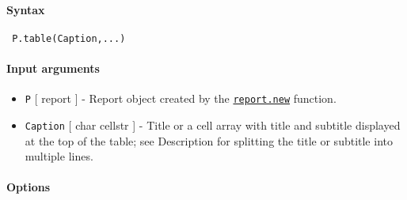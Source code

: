 


	\paragraph{Syntax}
 
 \begin{verbatim}
 P.table(Caption,...)
 \end{verbatim}
 
 \paragraph{Input arguments}
 
 \begin{itemize}
 \item
   \texttt{P} {[} report {]} - Report object created by the
   \href{report/new}{\texttt{report.new}} function.
 \item
   \texttt{Caption} {[} char \textbar{} cellstr {]} - Title or a cell
   array with title and subtitle displayed at the top of the table; see
   Description for splitting the title or subtitle into multiple lines.
 \end{itemize}
 
 \paragraph{Options}
 
